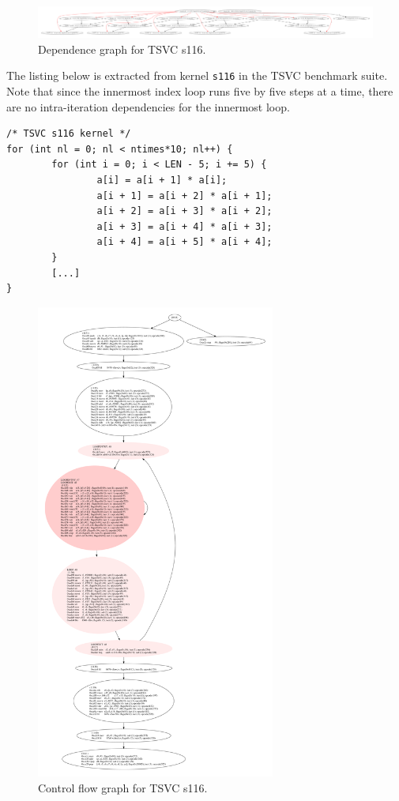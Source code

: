 \documentclass[11pt, a4paper, twoside]{montblanc2}
\begin{document}
\begin{figure}[h]
  \centering
\includegraphics[width=1\textwidth]{fs116_l47}
\caption{Dependence graph for TSVC s116.}\label{fig:dgs116}
\end{figure}

The listing below is extracted from kernel \texttt{s116} in the TSVC benchmark
suite. Note that since the innermost index loop runs five by five steps at a time, there are no
intra-iteration dependencies for the innermost loop.
\lstset{style=C}
\begin{lstlisting}
/* TSVC s116 kernel */
for (int nl = 0; nl < ntimes*10; nl++) {
        for (int i = 0; i < LEN - 5; i += 5) {
                a[i] = a[i + 1] * a[i];
                a[i + 1] = a[i + 2] * a[i + 1];
                a[i + 2] = a[i + 3] * a[i + 2];
                a[i + 3] = a[i + 4] * a[i + 3];
                a[i + 4] = a[i + 5] * a[i + 4];
        }
        [...]
}
\end{lstlisting}
\begin{figure}[p]
  \centering
\includegraphics[width=0.70\textwidth]{cfg_s116}
\caption{Control flow graph for TSVC s116.}\label{fig:cfgs116}
\end{figure}
\end{document}
